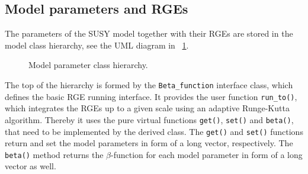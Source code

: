 \documentclass[final,3p,11pt,pdflatex]{elsarticle}
\newcommand{\code}[1]{\lstinline|#1|}  %
\newcommand{\figref}[1]{\figurename~\ref{#1}}
\begin{document}
\subsection{Model parameters and RGEs}
\label{Sec:ModelParametersAndRGEs}

The parameters of the SUSY model together with their RGEs are stored
in the model class hierarchy, see the UML diagram in
\figref{fig:parameter-classes}.
%
\begin{figure}
  \centering
  \caption{Model parameter class hierarchy.}
  \label{fig:parameter-classes}
\end{figure}

The top of the hierarchy is formed by the \code{Beta_function}
interface class, which defines the basic RGE running interface.  It
provides the user function \code{run_to()}, which integrates the RGEs
up to a given scale using an adaptive Runge-Kutta algorithm.  Thereby
it uses the pure virtual functions \code{get()}, \code{set()} and
\code{beta()}, that need to be implemented by the derived class.  The
\code{get()} and \code{set()} functions return and set the model
parameters in form of a long vector, respectively.  The \code{beta()}
method returns the $\beta$-function for each model parameter in form
of a long vector as well.
\end{document}

